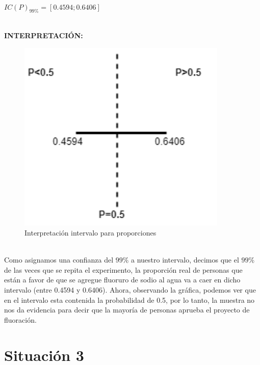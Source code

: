 \documentclass[letterpaper,12pt,onecolumn,titlepage]{article}
\begin{document}
~\\ $IC(P)_{99\%}=[0.4594 ; 0.6406]$

~\\ \textbf{INTERPRETACI\'{O}N:}
 \begin{figure}[!h]
    \begin{center}
        \includegraphics[width=10cm]{Figuras/Grafico1.png}
        \caption{Interpretaci\'{o}n intervalo para proporciones}
        \label{fig:Densidad}
    \end{center}
\end{figure}

~\\ Como asignamos una confianza del $99\%$ a nuestro intervalo, decimos que el $99\%$ de las veces que se repita el experimento, la proporci\'{o}n real de personas que est\'{a}n a favor de que se agregue fluoruro de sodio al agua va a caer en dicho intervalo (entre 0.4594 y 0.6406). Ahora, observando la gr\'{a}fica, podemos ver que en el intervalo esta contenida la probabilidad de 0.5, por lo tanto, la muestra no nos da evidencia para decir que la mayor\'{i}a de personas aprueba el proyecto de fluoraci\'{o}n.

\pagebreak\section{Situaci\'{o}n 3}
\end{document}
